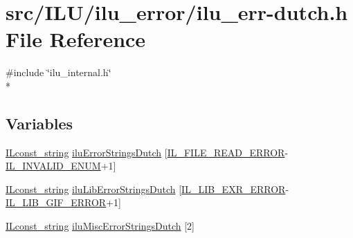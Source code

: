 \hypertarget{ilu__err-dutch_8h}{\section{src/\-I\-L\-U/ilu\-\_\-error/ilu\-\_\-err-\/dutch.h File Reference}
\label{ilu__err-dutch_8h}
}
{\ttfamily \#include \char`\"{}ilu\-\_\-internal.\-h\char`\"{}}\\*
\subsection*{Variables}
\begin{DoxyCompactItemize}
\item 
\hyperlink{il_8h_a103ef32cc870d648d471aff6c7076747}{I\-Lconst\-\_\-string} \hyperlink{ilu__err-dutch_8h_a5cd7601aa0c9681edf0a8f8e99fd1f09}{ilu\-Error\-Strings\-Dutch} \mbox{[}\hyperlink{il_8h_ae70fdd3b6e8434371177ed2547b75841}{I\-L\-\_\-\-F\-I\-L\-E\-\_\-\-R\-E\-A\-D\-\_\-\-E\-R\-R\-O\-R}-\/\hyperlink{il_8h_adf311fb99b5d12d7ef3795b0ab3dd918}{I\-L\-\_\-\-I\-N\-V\-A\-L\-I\-D\-\_\-\-E\-N\-U\-M}+1\mbox{]}
\item 
\hyperlink{il_8h_a103ef32cc870d648d471aff6c7076747}{I\-Lconst\-\_\-string} \hyperlink{ilu__err-dutch_8h_ae58f9e0fd6146064cac3fb3a55510077}{ilu\-Lib\-Error\-Strings\-Dutch} \mbox{[}\hyperlink{il_8h_a4792903188701caaeaa625e49af84a66}{I\-L\-\_\-\-L\-I\-B\-\_\-\-E\-X\-R\-\_\-\-E\-R\-R\-O\-R}-\/\hyperlink{il_8h_ab2d4eb290bfe9e2e5c8d590213034e50}{I\-L\-\_\-\-L\-I\-B\-\_\-\-G\-I\-F\-\_\-\-E\-R\-R\-O\-R}+1\mbox{]}
\item 
\hyperlink{il_8h_a103ef32cc870d648d471aff6c7076747}{I\-Lconst\-\_\-string} \hyperlink{ilu__err-dutch_8h_ae2160d5779eabd12d4ddd027e6dc9958}{ilu\-Misc\-Error\-Strings\-Dutch} \mbox{[}2\mbox{]}
\end{DoxyCompactItemize}


